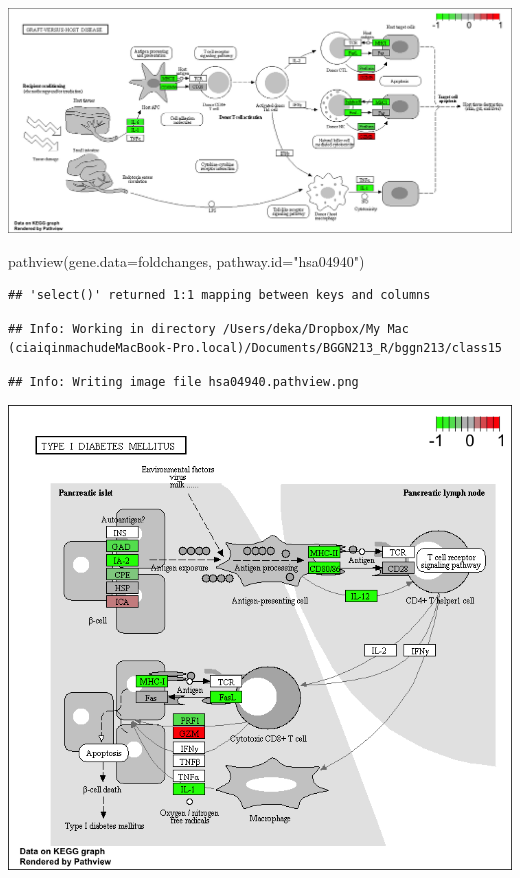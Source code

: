 \documentclass[
]{article}
\newenvironment{Shaded}{\begin{snugshade}}{\end{snugshade}}
\newcommand{\AttributeTok}[1]{\textcolor[rgb]{0.77,0.63,0.00}{#1}}
\newcommand{\FunctionTok}[1]{\textcolor[rgb]{0.00,0.00,0.00}{#1}}
\newcommand{\NormalTok}[1]{#1}
\newcommand{\StringTok}[1]{\textcolor[rgb]{0.31,0.60,0.02}{#1}}
\begin{document}
\includegraphics{hsa05332.pathview.png}

\begin{Shaded}
\begin{Highlighting}[]
\FunctionTok{pathview}\NormalTok{(}\AttributeTok{gene.data=}\NormalTok{foldchanges, }\AttributeTok{pathway.id=}\StringTok{"hsa04940"}\NormalTok{)}
\end{Highlighting}
\end{Shaded}

\begin{verbatim}
## 'select()' returned 1:1 mapping between keys and columns
\end{verbatim}

\begin{verbatim}
## Info: Working in directory /Users/deka/Dropbox/My Mac (ciaiqinmachudeMacBook-Pro.local)/Documents/BGGN213_R/bggn213/class15
\end{verbatim}

\begin{verbatim}
## Info: Writing image file hsa04940.pathview.png
\end{verbatim}

\includegraphics{hsa04940.pathview.png}
\end{document}
